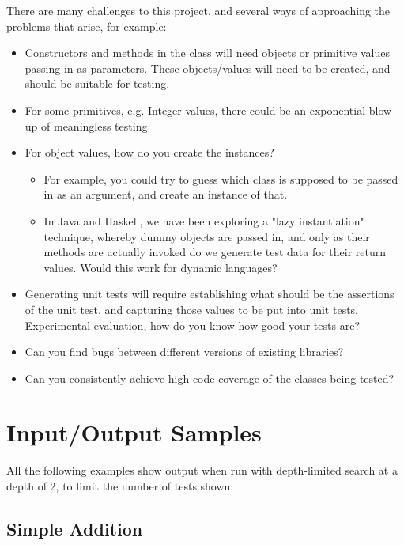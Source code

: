 There are many challenges to this project, and several ways of
approaching the problems that arise, for example:

\begin{itemize}
\item Constructors and methods in the class will need objects or primitive
  values passing in as parameters. These objects/values will need
  to be created, and should be suitable for testing.

\item For some primitives, e.g. Integer values, there could be an exponential
  blow up of meaningless testing

\item For object values, how do you create the instances?
\begin{itemize}
\item For example, you could try to guess which class is supposed to be
      passed in as an argument, and create an instance of that.
\item In Java and Haskell, we have been exploring a "lazy
      instantiation" technique, whereby dummy objects are passed in,
      and only as their methods are actually invoked do we generate
      test data for their return values. Would this work for dynamic
      languages?
\end{itemize}

\item Generating unit tests will require establishing what should be the
      assertions of the unit test, and capturing those values to be put
      into unit tests.
      Experimental evaluation, how do you know how good your tests are?

\item Can you find bugs between different versions of existing libraries?

\item Can you consistently achieve high code coverage of the classes
      being tested?
\end{itemize}

\chapter{Input/Output Samples}
\lstset{language=Ruby}

All the following examples show output when run with depth-limited search at a
depth of 2, to limit the number of tests shown.

\section{Simple Addition}
